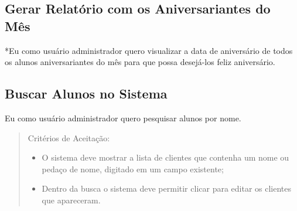 \subsection[Gerar Relatório com os Aniversariantes do Mês]{Gerar Relatório com os Aniversariantes do Mês}
*Eu como usuário administrador quero visualizar a data de aniversário de todos os
alunos aniversariantes do mês para que possa desejá-los feliz aniversário.

\subsection[Buscar Alunos no Sistema]{Buscar Alunos no Sistema}
Eu como usuário administrador quero pesquisar alunos por nome.

\begin{quote}
Critérios de Aceitação:
    \begin{itemize}
        \item O sistema deve mostrar a lista de clientes que contenha um nome ou pedaço de
        nome, digitado em um campo existente;
        \item Dentro da busca o sistema deve permitir clicar para editar os clientes que
        apareceram.
    \end{itemize}
\end{quote}
